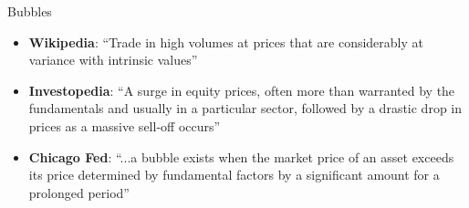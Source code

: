 \documentclass[english,10pt
,aspectratio=169
]{beamer}
\begin{document}
\begin{frame}{Bubbles}
	\begin{itemize}
		\item \textbf{Wikipedia}: ``Trade in high volumes at prices that are considerably at variance with intrinsic values''
		\item \textbf{Investopedia}: ``A surge in equity prices, often more than warranted by the fundamentals and usually in a particular sector, followed by a drastic drop in prices as a massive sell-off occurs''
		\item \textbf{Chicago Fed}: ``...a bubble exists when the market price of an asset exceeds its price determined by fundamental factors by a significant amount for a prolonged period''
	\end{itemize}
\end{frame}


\end{document}
